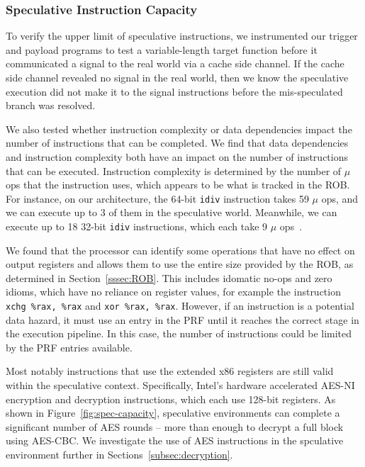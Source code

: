 
\subsubsection{Speculative Instruction Capacity}

To verify the upper limit of speculative instructions, we instrumented our
trigger and payload programs to test a variable-length target function before it
communicated a signal to the real world via a cache side channel. If the cache
side channel revealed no signal in the real world, then we know the speculative
execution did not make it to the signal instructions before the mis-speculated
branch was resolved.

We also tested whether instruction complexity or data dependencies impact the
number of instructions that can be completed. We find that data dependencies and
instruction complexity both have an impact on the number of instructions that
can be executed. Instruction complexity is determined by the number of $\mu$ ops
that the instruction uses, which appears to be what is tracked in the ROB. For
instance, on our architecture, the 64-bit \texttt{idiv} instruction takes 59
$\mu$ ops, and we can execute up to 3 of them in the speculative world.
Meanwhile, we can execute up to 18 32-bit \texttt{idiv} instructions, which each
take 9 $\mu$ ops~\cite{intel-instruction-tables}.

We found that the processor can identify some operations that have no effect on
output registers and allows them to use the entire size provided by the ROB, as
determined in Section~\ref{sssec:ROB}. This includes idomatic no-ops and zero
idioms, which have no reliance on register values, for example the instruction
\texttt{xchg \%rax, \%rax} and \texttt{xor \%rax, \%rax}. However, if an
instruction is a potential data hazard, it must use an entry in the PRF until it
reaches the correct stage in the execution pipeline. In this case, the number of
instructions could be limited by the PRF entries available.


Most notably instructions that use the extended x86 registers are still valid
within the speculative context. Specifically, Intel's hardware accelerated
AES-NI encryption and decryption instructions, which each use 128-bit registers.
As shown in Figure~\ref{fig:spec-capacity}, speculative environments can
complete a significant number of AES rounds -- more than enough to decrypt a
full block using AES-CBC. We investigate the use of AES instructions in the
spculative environment further in Sections~\ref{subsec:decryption}.

